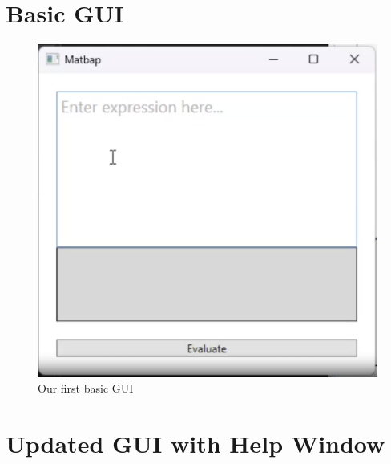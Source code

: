 \documentclass[a4paper, oneside, 11pt]{report}
\begin{document}
\section{Basic GUI}
\begin{figure}[H]
\begin{center}
\includegraphics[scale=0.3 ]{Basic GUI.png}
\caption{Our first basic GUI}
\label{basicgui}
\end{center}
\end{figure}

\section{Updated GUI with Help Window}
\label{helpgui}
\end{document}
